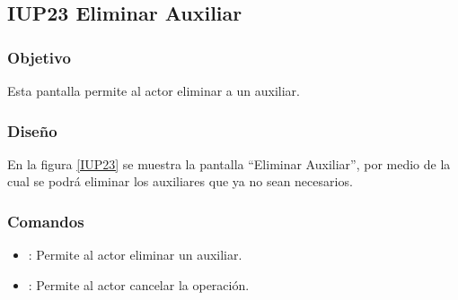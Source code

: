 \subsection{IUP23 Eliminar Auxiliar}
 
\subsubsection{Objetivo}

    Esta pantalla permite al actor eliminar a un auxiliar.

\subsubsection{Diseño}

    En la figura \ref{IUP23} se muestra la pantalla ``Eliminar Auxiliar'', por medio de la cual se podrá eliminar los auxiliares que ya no sean necesarios. \\


\subsubsection{Comandos}
\begin{itemize}
    \item {}: Permite al actor eliminar un auxiliar.
    \item {}: Permite al actor cancelar la operación.
    
\end{itemize}

%
